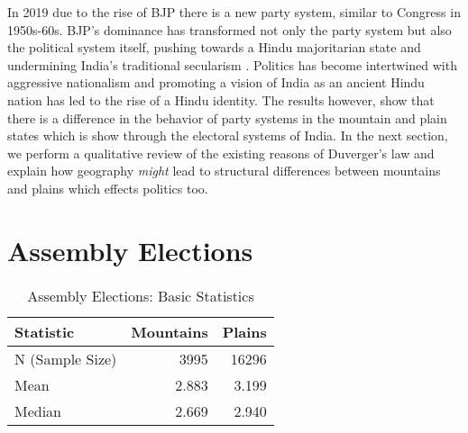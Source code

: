 \vspace{0.3cm}
In 2019 due to the rise of BJP there is a new party system, similar to Congress in 1950s-60s. BJP's dominance has transformed not only the party system but also the political system itself, pushing towards a Hindu majoritarian state and undermining India's traditional secularism \citep{jaffrelot2020bjp}.  Politics has become intertwined with aggressive nationalism and promoting a vision of India as an ancient Hindu nation has led to the rise of a Hindu identity. The results however, show that there is a difference in the behavior of party systems in the mountain and plain states which is show through the electoral systems of India. In the next section, we perform a qualitative review of the existing reasons of Duverger's law and explain how geography \textit{might} lead to structural differences between mountains and plains which effects politics too.





\section{Assembly Elections}
\begin{table}[h!]
    \centering
    \begin{tabular}{|l|r|r|}
    \hline
    \textbf{Statistic} & \textbf{Mountains} & \textbf{Plains} \\ \hline
    N (Sample Size) & 3995 & 16296 \\
    Mean & 2.883 & 3.199 \\
    Median & 2.669 & 2.940 \\ \hline
    \end{tabular}
    \caption{Assembly Elections: Basic Statistics}
    \label{tab:assembly_summary_statistics}
    \end{table}
    
